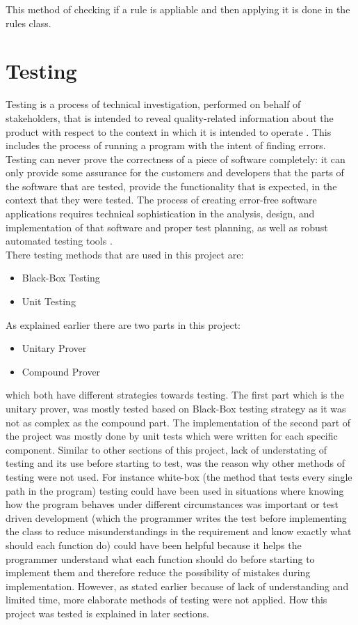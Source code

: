 \documentclass[10pt, a4paper, titlepage]{article}
\begin{document}
This method of checking if a rule is appliable and then applying it is done in the rules class. 

\newpage
\section{Testing}
\label{sec:Testing}
Testing is a process of technical investigation, performed on behalf of stakeholders, that is intended to reveal quality-related information about the product with respect to the context in which it is intended to operate \cite{testing_site}. This includes the process of running a program with the intent of finding errors. Testing can never prove the correctness of a piece of software completely: it can only provide some assurance for the customers and developers that the parts of the software that are tested, provide the functionality that is expected, in the context that they were tested. The process of creating error-free software applications requires technical sophistication in the analysis, design, and implementation of that software and proper test planning, as well as robust automated testing tools \cite{ISTQB_book}.\\

There testing methods that are used in this project are:
\begin{itemize}
\item Black-Box Testing
\item Unit Testing
\end{itemize}

As explained earlier there are two parts in this project:
\begin{itemize}
\item Unitary Prover 
\item Compound Prover
\end{itemize}
which both have different strategies towards testing. The first part which is the unitary prover, was mostly tested based on Black-Box testing strategy as it was not as complex as the compound part. The implementation of the second part of the project was mostly done by unit tests which were written for each specific component. Similar to other sections of this project, lack of understating of testing and its use before starting to test, was the reason why other methods of testing were not used. For instance white-box (the method that tests every single path in the program) testing could have been used in situations where knowing how the program behaves under different circumstances was important or test driven development (which the programmer writes the test before implementing the class to reduce misunderstandings in the requirement and know exactly what should each function do) could have been helpful  because it helps the programmer understand what each function should do before starting to implement them and therefore reduce the possibility of mistakes during implementation. However, as stated earlier because of lack of understanding and limited time, more elaborate methods of testing were not applied. How this project was tested is explained in later sections. 
\end{document}
